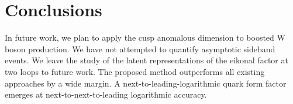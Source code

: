 \section{Conclusions}\label{sec:conclusions}

In future work, we plan to apply the cusp anomalous dimension to boosted
W boson production. We have not attempted to quantify asymptotic
sideband events. We leave the study of the latent representations of the
eikonal factor at two loops to future work. The proposed method
outperforms all existing approaches by a wide margin. A
next-to-leading-logarithmic quark form factor emerges at
next-to-next-to-leading logarithmic accuracy.

